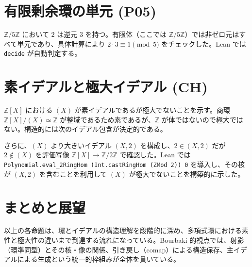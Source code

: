 \documentclass[12pt]{ltjsarticle}
\theoremstyle{definition}
\theoremstyle{remark}
\begin{document}
\section{有限剰余環の単元 (P05)}
$\mathbb{Z}/5\mathbb{Z}$ において $2$ は逆元 $3$ を持つ。有限体（ここでは $\mathbb{Z}/5\mathbb{Z}$）では非ゼロ元はすべて単元であり、具体計算により $2 \cdot 3 \equiv 1 \pmod{5}$ をチェックした。Lean では \texttt{decide} が自動判定する。

\section{素イデアルと極大イデアル (CH)}
$\mathbb{Z}[X]$ における $(X)$ が素イデアルであるが極大でないことを示す。商環 $\mathbb{Z}[X]/(X) \simeq \mathbb{Z}$ が整域であるため素であるが、$\mathbb{Z}$ が体ではないので極大ではない。構造的には次のイデアル包含が決定的である。


さらに、$(X)$ より大きいイデアル $(X,2)$ を構成し、$2 \in (X,2)$ だが $2 \notin (X)$ を評価写像 $\mathbb{Z}[X] \to \mathbb{Z}/2\mathbb{Z}$ で確認した。Lean では \texttt{Polynomial.eval\_2RingHom (Int.castRingHom (ZMod 2)) 0} を導入し、その核が $(X,2)$ を含むことを利用して $(X)$ が極大でないことを構築的に示した。

\section{まとめと展望}
以上の各命題は、環とイデアルの構造理解を段階的に深め、多項式環における素性と極大性の違いまで到達する流れになっている。Bourbaki 的視点では、射影（環準同型）とその核・像の関係、引き戻し（comap）による構造保存、主イデアルによる生成という統一的枠組みが全体を貫いている。
\end{document}

